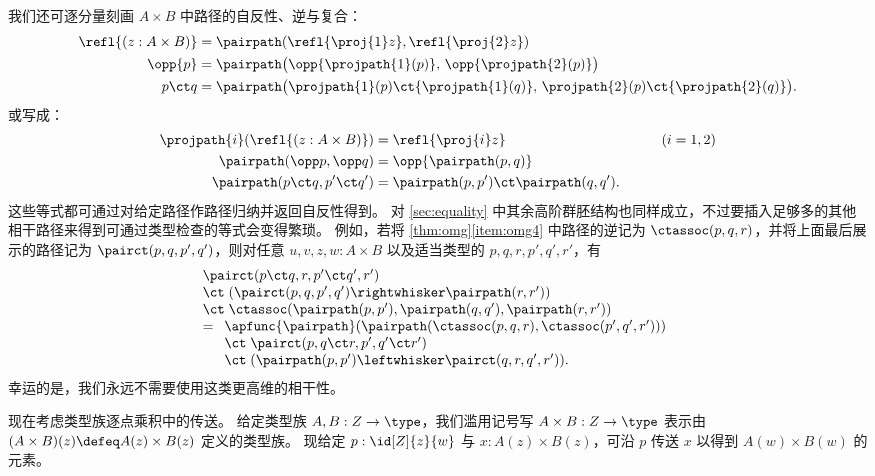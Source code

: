 我们还可逐分量刻画 $A\times B$ 中路径的自反性、逆与复合：
\begin{align*}
  {\refl{(z : A \times B)}}
  &= {\pairpath (\refl{\proj{1} z},\refl{\proj{2} z})} \\
  {\opp{p}}
  &= {\pairpath \big(\opp{\projpath{1} (p)},\, \opp{\projpath{2} (p)}\big)} \\
  {{p \ct q}}
  &= {\pairpath \big({\projpath{1} (p)} \ct {\projpath{1} (q)},\,{\projpath{2} (p)} \ct {\projpath{2} (q)}\big)}.
\end{align*}
或写成：
\begin{alignat*}{2}
  \projpath{i}(\refl{(z : A \times B)}) &= \refl{\proj{i} z} &\qquad (i=1,2)\\
  \pairpath(\opp p, \opp q) &= \opp{\pairpath(p,q)}\\
  \pairpath(p\ct q, p'\ct q') &= \pairpath(p,p') \ct \pairpath(q,q').
\end{alignat*}
这些等式都可通过对给定路径作路径归纳并返回自反性得到。
对 \cref{sec:equality} 中其余高阶群胚结构也同样成立，不过要插入足够多的其他相干路径来得到可通过类型检查的等式会变得繁琐。
例如，若将 \cref{thm:omg}\ref{item:omg4} 中路径的逆记为 $\ctassoc(p,q,r)$，并将上面最后展示的路径记为 $\pairct(p,q,p',q')$，则对任意 $u,v,z,w:A\times B$ 以及适当类型的 $p,q,r,p',q',r'$，有
\begin{equation*}
  \begin{array}{l}
    \pairct(p\ct q, r, p'\ct q', r') \\
    \ct\;  (\pairct(p,q,p',q') \rightwhisker \pairpath(r,r')) \\
    \ct\;  \ctassoc(\pairpath(p,p'),\pairpath(q,q'),\pairpath(r,r'))\\
    =
    \begin{array}[t]{l}
      \apfunc{\pairpath}({\pairpath(\ctassoc(p,q,r),\ctassoc(p',q',r'))})\\
      \ct\; \pairct(p, q\ct r, p', q'\ct r')\\
      \ct\; (\pairpath(p,p') \leftwhisker \pairct(q,r,q',r')).
    \end{array}
  \end{array}
\end{equation*}
幸运的是，我们永远不需要使用这类更高维的相干性。

%
现在考虑类型族逐点乘积中的传送。
给定类型族 $ A, B : Z \to \type$，我们滥用记号写 $A\times B:Z\to \type$ 表示由 $(A\times B)(z) \defeq A(z) \times B(z)$ 定义的类型族。
现给定 $p : \id[Z]{z}{w}$ 与 $x : A(z) \times B(z)$，可沿 $p$ 传送 $x$ 以得到 $A(w)\times B(w)$ 的元素。

